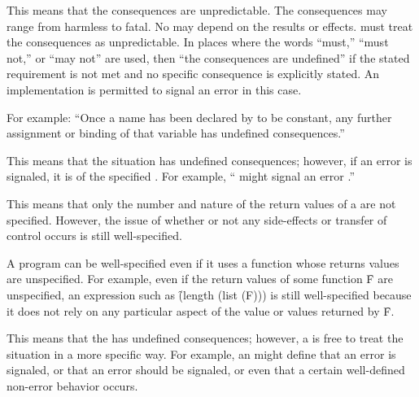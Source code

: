 %

This means that the consequences are unpredictable. The consequences
may range from harmless to fatal.  No  may depend on
the results or effects.  must treat the consequences as
unpredictable.  In places where the words ``must,'' ``must not,'' or
``may not'' are used, then ``the consequences are undefined'' if the
stated requirement is not met and no specific consequence is
explicitly stated.  An implementation is permitted to signal an error
in this case.

For example: ``Once a name has been declared by 
to be constant, any further assignment or binding of that
variable has undefined consequences.''
                                               
%

This means that the situation has undefined consequences;
however, if an error is signaled, it is of the specified .
For example, `` might signal an error .''
                           
%

This means that only the number and nature of the return values of a
 are not specified.  However, the issue of whether or not
any side-effects or transfer of control occurs is still well-specified.

A program can be well-specified even if it uses a function whose
returns values are unspecified.  For example, even if the return
values of some function \f{F} are unspecified, an expression such as
\f{(length (list (F)))} is still well-specified because it does not
rely on any particular aspect of the value or values returned by \f{F}.

%

This means that the  has undefined consequences;
however, a  is free to treat
the situation in a more specific way.  
For example, an  might define 
    that      an error is signaled,
 or that      an error should be signaled,
 or even that a certain well-defined non-error behavior occurs.

